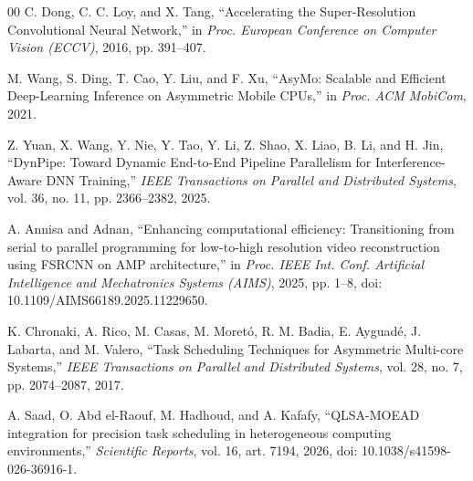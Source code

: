 \documentclass[conference]{IEEEtran}
\begin{document}
\begin{thebibliography}{00}
C. Dong, C. C. Loy, and X. Tang, ``Accelerating the Super-Resolution Convolutional Neural Network,'' in \textit{Proc. European Conference on Computer Vision (ECCV)}, 2016, pp. 391--407.

M. Wang, S. Ding, T. Cao, Y. Liu, and F. Xu, ``AsyMo: Scalable and Efficient Deep-Learning Inference on Asymmetric Mobile CPUs,'' in \textit{Proc. ACM MobiCom}, 2021.

Z. Yuan, X. Wang, Y. Nie, Y. Tao, Y. Li, Z. Shao, X. Liao, B. Li, and H. Jin, ``DynPipe: Toward Dynamic End-to-End Pipeline Parallelism for Interference-Aware DNN Training,'' \textit{IEEE Transactions on Parallel and Distributed Systems}, vol. 36, no. 11, pp. 2366--2382, 2025.

A. Annisa and Adnan, ``Enhancing computational efficiency: Transitioning from serial to parallel programming for low-to-high resolution video reconstruction using FSRCNN on AMP architecture,'' in \textit{Proc. IEEE Int. Conf. Artificial Intelligence and Mechatronics Systems (AIMS)}, 2025, pp. 1--8, doi: 10.1109/AIMS66189.2025.11229650.

K. Chronaki, A. Rico, M. Casas, M. Moretó, R. M. Badia, E. Ayguadé, J. Labarta, and M. Valero, ``Task Scheduling Techniques for Asymmetric Multi-core Systems,'' \textit{IEEE Transactions on Parallel and Distributed Systems}, vol. 28, no. 7, pp. 2074--2087, 2017.

A. Saad, O. Abd el-Raouf, M. Hadhoud, and A. Kafafy, ``QLSA-MOEAD integration for precision task scheduling in heterogeneous computing environments,'' \textit{Scientific Reports}, vol. 16, art. 7194, 2026, doi: 10.1038/s41598-026-36916-1.

\end{thebibliography}
\end{document}
